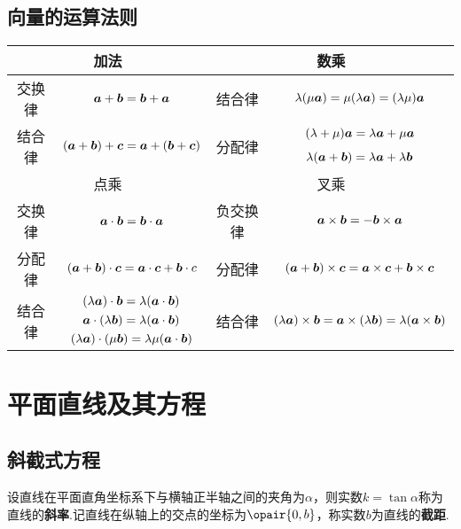 \subsection{向量的运算法则}
\begin{center}
\begin{tabular}{|c|c|c|c|}
\hline
\multicolumn{2}{|c|}{加法} & \multicolumn{2}{c|}{数乘} \\ \hline
交换律 & \(\boldsymbol{a}+\boldsymbol{b}=\boldsymbol{b}+\boldsymbol{a}\) &
	结合律 & \(\lambda(\mu\boldsymbol{a})=\mu(\lambda\boldsymbol{a})=(\lambda\mu)\boldsymbol{a}\) \\ \hline
\multirow{2}{*}{结合律} & \multirow{2}{*}{\((\boldsymbol{a}+\boldsymbol{b})+\boldsymbol{c}=\boldsymbol{a}+(\boldsymbol{b}+\boldsymbol{c})\)} &
	\multirow{2}{*}{分配律} & \((\lambda+\mu)\boldsymbol{a}=\lambda\boldsymbol{a}+\mu\boldsymbol{a}\) \\
 & & & \(\lambda(\boldsymbol{a}+\boldsymbol{b})=\lambda\boldsymbol{a}+\lambda\boldsymbol{b}\) \\ \hline
\multicolumn{2}{|c|}{点乘} & \multicolumn{2}{c|}{叉乘} \\ \hline
交换律 & \(\boldsymbol{a}\cdot\boldsymbol{b}=\boldsymbol{b}\cdot\boldsymbol{a}\) &
	负交换律 & \(\boldsymbol{a}\times\boldsymbol{b}=-\boldsymbol{b}\times\boldsymbol{a}\) \\ \hline
分配律 & \((\boldsymbol{a}+\boldsymbol{b})\cdot\boldsymbol{c}=\boldsymbol{a}\cdot\boldsymbol{c}+\boldsymbol{b}\cdot{c}\) &
	分配律 & \((\boldsymbol{a}+\boldsymbol{b})\times\boldsymbol{c}=\boldsymbol{a}\times\boldsymbol{c}+\boldsymbol{b}\times\boldsymbol{c}\) \\ \hline
\multirow{3}{*}{结合律} & \((\lambda\boldsymbol{a})\cdot\boldsymbol{b}=\lambda(\boldsymbol{a}\cdot\boldsymbol{b})\) & \multirow{3}{*}{结合律} & \multirow{3}{*}{\((\lambda\boldsymbol{a})\times\boldsymbol{b}=\boldsymbol{a}\times(\lambda\boldsymbol{b})=\lambda(\boldsymbol{a}\times\boldsymbol{b})\)} \\
	& \(\boldsymbol{a}\cdot(\lambda\boldsymbol{b})=\lambda(\boldsymbol{a}\cdot\boldsymbol{b})\) & & \\
	& \((\lambda\boldsymbol{a})\cdot(\mu\boldsymbol{b})=\lambda\mu(\boldsymbol{a}\cdot\boldsymbol{b})\) & & \\
\hline
\end{tabular}
\end{center}

\section{平面直线及其方程}
\subsection{斜截式方程}
设直线在平面直角坐标系下与横轴正半轴之间的夹角为\(\alpha\)，则实数\(k = \tan \alpha\)称为直线的\textbf{斜率}.记直线在纵轴上的交点的坐标为\(\opair{0,b}\)，称实数\(b\)为直线的\textbf{截距}.

